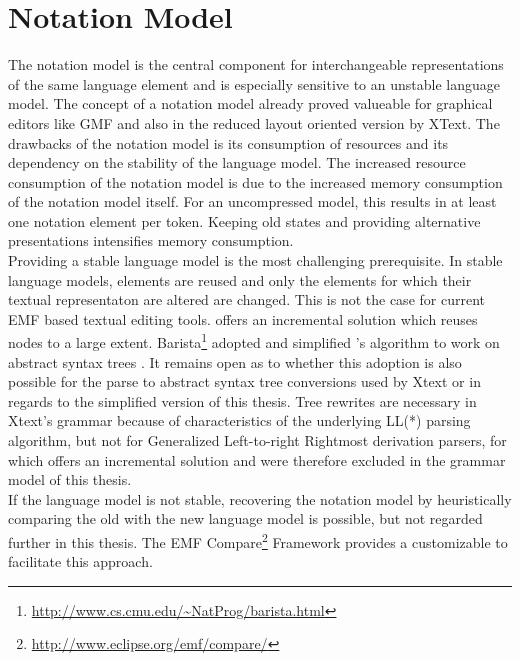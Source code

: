 \section{Notation Model} The notation model is the central component for interchangeable representations of the same language element and is especially sensitive to an unstable language model. The concept of a notation model already proved valueable for graphical editors like GMF and also in the reduced layout oriented version by XText. The drawbacks of the notation model is its consumption of resources and its dependency on the stability of the language model. The increased resource consumption of the notation model is due to the increased memory consumption of the notation model itself. For an uncompressed model, this results in at least one notation element per token. Keeping old states and providing alternative presentations intensifies memory consumption. \\ %
Providing a stable language model is the most challenging prerequisite. In stable language models, elements are reused and only the elements for which their textual representaton are altered are changed. This is not the case for current EMF based textual editing tools. \cite{iSW} offers an incremental solution which reuses nodes to a large extent. Barista\footnote{\raggedright \url{http://www.cs.cmu.edu/~NatProg/barista.html}} adopted and simplified \cite{iSW}'s algorithm to work on abstract syntax trees \cite{Barista}. It remains open as to whether this adoption is also possible for the parse to abstract syntax tree conversions used by Xtext or in regards to the simplified version of this thesis. Tree rewrites are necessary in Xtext's grammar because of characteristics of the underlying LL(*) parsing algorithm, but not for Generalized Left-to-right Rightmost derivation parsers, for which \cite{iSW} offers an incremental solution and were therefore excluded in the grammar model of this thesis. \\%
If the language model is not stable, recovering the notation model by heuristically comparing the old with the new language model is possible, but not regarded further in this thesis. The EMF Compare\footnote{\raggedright \url{http://www.eclipse.org/emf/compare/}} Framework provides a customizable  to facilitate this approach. \\

